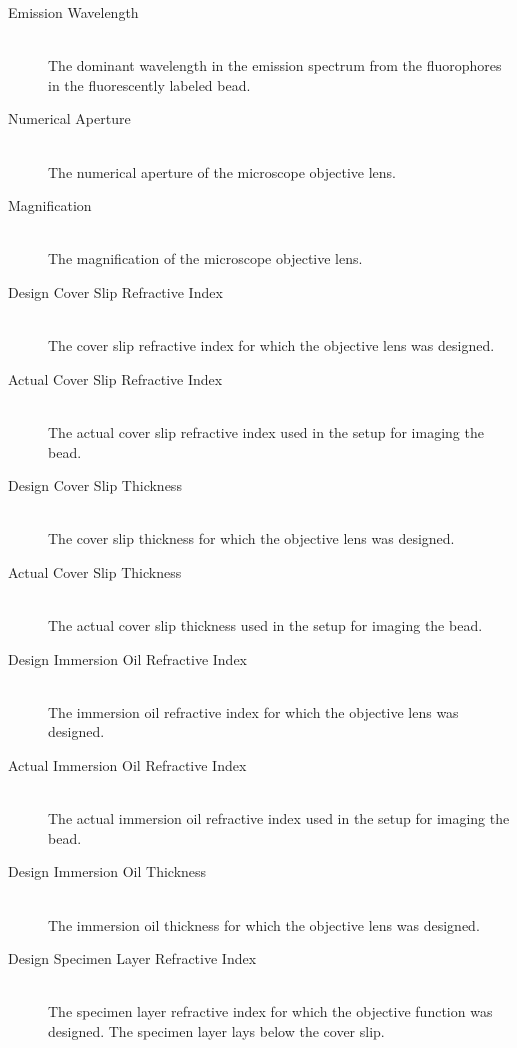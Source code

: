 \documentclass[11pt,titlepage,twoside]{article}
\begin{document}
\begin{description}

  \item[Emission Wavelength] \hfill \\
   The dominant wavelength in the emission spectrum from the fluorophores in the fluorescently labeled bead.
  
  \item[Numerical Aperture] \hfill \\
   The numerical aperture of the microscope objective lens.
  
  \item[Magnification] \hfill \\
   The magnification of the microscope objective lens.

  \item[Design Cover Slip Refractive Index] \hfill \\
   The cover slip refractive index for which the objective lens was designed.
  
  \item[Actual Cover Slip Refractive Index] \hfill \\
   The actual cover slip refractive index used in the setup for imaging the bead.
  
  \item[Design Cover Slip Thickness] \hfill \\
   The cover slip thickness for which the objective lens was designed.
  
  \item[Actual Cover Slip Thickness] \hfill \\
   The actual cover slip thickness used in the setup for imaging the bead.
  
  \item[Design Immersion Oil Refractive Index] \hfill \\
   The immersion oil refractive index for which the objective lens was designed.
  
  \item[Actual Immersion Oil Refractive Index] \hfill \\
   The actual immersion oil refractive index used in the setup for imaging the bead.
  
  \item[Design Immersion Oil Thickness] \hfill \\
   The immersion oil thickness for which the objective lens was designed.
  
  \item[Design Specimen Layer Refractive Index] \hfill \\
   The specimen layer refractive index for which the objective function was designed. The specimen layer lays below the cover slip.
  

\end{description}
\end{document}
